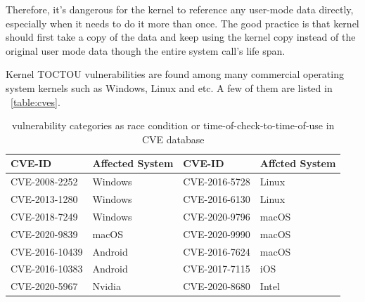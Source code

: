Therefore, it's dangerous for the kernel to reference any user-mode data directly, especially when it needs to do it more than once. The good practice is that kernel should first take a copy of the data and keep using the kernel copy instead of the original user mode data though the entire system call's life span.


Kernel TOCTOU vulnerabilities are found among many commercial operating system kernels such as Windows, Linux and etc. A few of them are listed in
~\autoref{table:cves}.

\begin{center}
\begin{table}[ht]
\small
\caption{vulnerability categories as race condition or time-of-check-to-time-of-use in CVE database}
\label{table:cves}
\centering
	\begin{tabular}{@{}>{\raggedright\arraybackslash}m{2.30cm}@{}|
			@{}>{\centering\arraybackslash}m{1.30cm}@{}|
			@{}>{\centering\arraybackslash}m{2.30cm}@{}|
			@{}>{\centering\arraybackslash}m{1.20cm}@{} } 
\hline
CVE-ID & Affected System & CVE-ID & Affcted System \\ %
\hline
CVE-2008-2252  & Windows & CVE-2016-5728 & Linux \\
CVE-2013-1280  & Windows & CVE-2016-6130 & Linux \\
CVE-2018-7249  & Windows & CVE-2020-9796 & macOS \\ 
CVE-2020-9839  & macOS   & CVE-2020-9990 & macOS \\
CVE-2016-10439 & Android & CVE-2016-7624 & macOS \\
CVE-2016-10383 & Android & CVE-2017-7115 & iOS \\

CVE-2020-5967  & Nvidia  & CVE-2020-8680 & Intel \\
\hline

\end{tabular}
\end{table}
\end{center}




